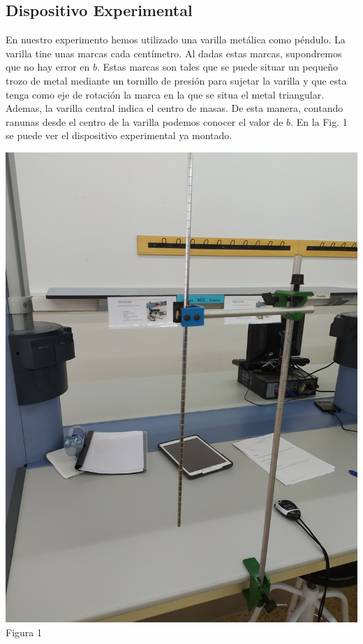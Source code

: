 \documentclass{article}
\begin{document}
\begin{multicols}{2}
\section{Dispositivo Experimental}
En nuestro experimento hemos utilizado una varilla metálica como péndulo. La varilla tine unas marcas cada centímetro. Al dadas estas marcas, supondremos que no hay error en $b$. Estas marcas son tales que se puede situar un pequeño trozo de metal mediante un tornillo de presión para sujetar la varilla y que esta tenga como eje de rotación la marca en la que se situa el metal triangular. Ademas, la varilla central indica el centro de masas. De esta manera, contando ranunas desde el centro de la varilla podemos conocer el valor de $b$. En la Fig. 1 se puede ver el dispositivo experimental ya montado.
\begin{center}
    \includegraphics[scale=0.05, angle=-90]{figures/c2.png}\\
    Figura 1
\end{center}


\end{multicols}
\end{document}
